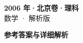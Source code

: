 \documentclass[zihao=-4, a4paper]{ctexart}
\begin{document}
\begin{center}
  {\Large\bfseries 2006 年·北京卷·理科}\\[4pt]
  {\large 数学 · 解析版}
\end{center}
\medskip
{}

\clearpage
{}
\begin{center}{\Large\bfseries 参考答案与详细解析}\end{center}
\medskip

\end{document}
